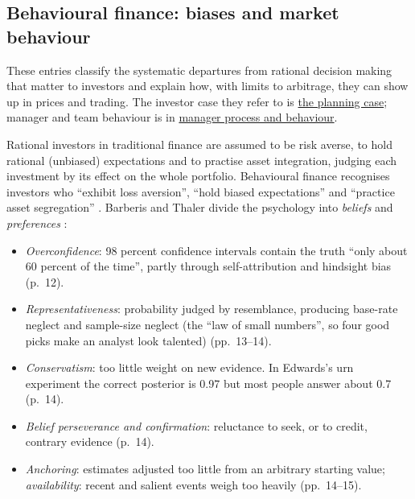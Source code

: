 \subsection{Behavioural finance: biases and market behaviour}

These entries classify the systematic departures from rational decision making that matter to investors and explain how, with limits to arbitrage, they can show up in prices and trading. The investor case they refer to is \hyperref[ex:investment-planning-case]{the planning case}; manager and team behaviour is in \hyperref[meth:manager-philosophy-process-behaviour]{manager process and behaviour}.

\begin{qfdefinition}\label{def:behavioural-biases}
 Rational investors in traditional finance are assumed to be risk averse, to hold rational (unbiased) expectations and to practise asset integration, judging each investment by its effect on the whole portfolio. Behavioural finance recognises investors who ``exhibit loss aversion'', ``hold biased expectations'' and ``practice asset segregation'' \citep[chap.~2, pp.~28--29]{managing-investment-portfolios-2007}. Barberis and Thaler divide the psychology into \emph{beliefs} and \emph{preferences} \citep[NBER working paper 9222 version, secs.~3.1--3.2, pp.~12--21]{wide-barberis-thaler-survey}:
\begin{itemize}
\item \emph{Overconfidence}: 98 percent confidence intervals contain the truth ``only about 60 percent of the time'', partly through self-attribution and hindsight bias (p.~12).
\item \emph{Representativeness}: probability judged by resemblance, producing base-rate neglect and sample-size neglect (the ``law of small numbers'', so four good picks make an analyst look talented) (pp.~13--14).
\item \emph{Conservatism}: too little weight on new evidence. In Edwards's urn experiment the correct posterior is 0.97 but most people answer about 0.7 (p.~14).
\item \emph{Belief perseverance and confirmation}: reluctance to seek, or to credit, contrary evidence (p.~14).
\item \emph{Anchoring}: estimates adjusted too little from an arbitrary starting value; \emph{availability}: recent and salient events weigh too heavily (pp.~14--15).

\end{itemize}
\end{qfdefinition}
